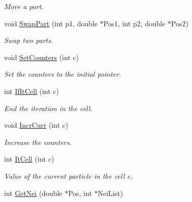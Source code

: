 \begin{DoxyCompactItemize}
\begin{DoxyCompactList}\small\item\em \-Move a part. \end{DoxyCompactList}\item 
\hypertarget{classDdArray_ae468af31d1a530ba0fdaef088c4b9c00}{void \hyperlink{classDdArray_ae468af31d1a530ba0fdaef088c4b9c00}{\-Swap\-Part} (int p1, double $\ast$\-Pos1, int p2, double $\ast$\-Pos2)}\label{classDdArray_ae468af31d1a530ba0fdaef088c4b9c00}

\begin{DoxyCompactList}\small\item\em \-Swap two parts. \end{DoxyCompactList}\item 
\hypertarget{classDdArray_aadd6f477626e28e8284b9db4649e841d}{void \hyperlink{classDdArray_aadd6f477626e28e8284b9db4649e841d}{\-Set\-Counters} (int c)}\label{classDdArray_aadd6f477626e28e8284b9db4649e841d}

\begin{DoxyCompactList}\small\item\em \-Set the counters to the initial pointer. \end{DoxyCompactList}\item 
\hypertarget{classDdArray_af49812231dd30b603631791b87eba9f9}{int \hyperlink{classDdArray_af49812231dd30b603631791b87eba9f9}{\-If\-It\-Cell} (int c)}\label{classDdArray_af49812231dd30b603631791b87eba9f9}

\begin{DoxyCompactList}\small\item\em \-End the iteration in the cell. \end{DoxyCompactList}\item 
\hypertarget{classDdArray_af5859063d6fe309152f039205b16014e}{void \hyperlink{classDdArray_af5859063d6fe309152f039205b16014e}{\-Incr\-Curr} (int c)}\label{classDdArray_af5859063d6fe309152f039205b16014e}

\begin{DoxyCompactList}\small\item\em \-Increase the counters. \end{DoxyCompactList}\item 
\hypertarget{classDdArray_a1fb1ab9e4e4c98b9860711fdb1fba3b4}{int \hyperlink{classDdArray_a1fb1ab9e4e4c98b9860711fdb1fba3b4}{\-It\-Cell} (int c)}\label{classDdArray_a1fb1ab9e4e4c98b9860711fdb1fba3b4}

\begin{DoxyCompactList}\small\item\em \-Value of the current particle in the cell c. \end{DoxyCompactList}\item 
\hypertarget{classDdArray_afe0e4e9746cdae570f8c1efdfd04ac16}{int \hyperlink{classDdArray_afe0e4e9746cdae570f8c1efdfd04ac16}{\-Get\-Nei} (double $\ast$\-Pos, int $\ast$\-Nei\-List)}\label{classDdArray_afe0e4e9746cdae570f8c1efdfd04ac16}


\end{DoxyCompactItemize}
